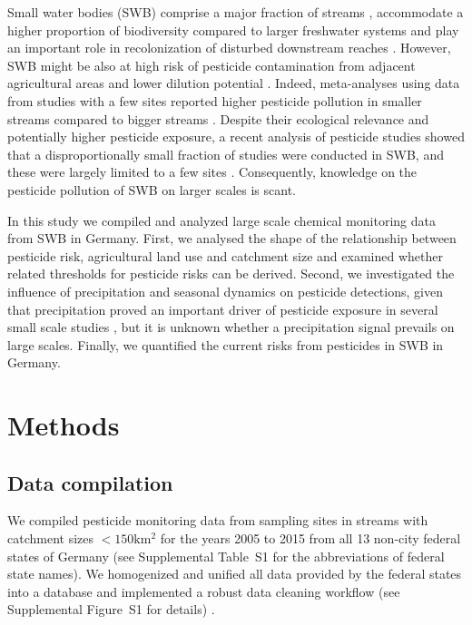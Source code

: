 \documentclass[journal=esthag,manuscript=article]{achemso}
\begin{document}
Small water bodies (SWB) comprise a major fraction of streams \citep{nadeau_hydrological_2007}
, accommodate a higher proportion of biodiversity compared to larger freshwater systems \citep{davies_comparison_2008, biggs_report_2014} and play an important role in recolonization of disturbed downstream reaches \citep{liess_analyzing_2005, orlinskiy_forested_2015}.
However, SWB might be also at high risk of pesticide contamination from adjacent agricultural areas and lower dilution potential \citep{schulz_field_2004,liess_determination_1999}.
Indeed, meta-analyses using data from studies with a few sites reported higher pesticide pollution in smaller streams compared to bigger streams \citep{stehle_pesticide_2015,schulz_field_2004}.
Despite their ecological relevance and potentially higher pesticide exposure, a recent analysis of pesticide studies showed that a disproportionally small fraction of studies were conducted in SWB, and these were largely limited to a few sites \citep{lorenz_specifics_2016}. Consequently, knowledge on the pesticide pollution of SWB on larger scales is scant.

In this study we compiled and analyzed large scale chemical monitoring data from SWB in Germany. First, we analysed the shape of the relationship between pesticide risk, agricultural land use and catchment size and examined whether related thresholds for pesticide risks can be derived. Second, we investigated the influence of precipitation and seasonal dynamics on pesticide detections, given that precipitation proved an important driver of pesticide exposure in several small scale studies \citep{wittmer_significance_2010}\citep{schulz_field_2004}, but it is unknown whether a precipitation signal prevails on large scales. 
Finally, we quantified the current risks from pesticides in SWB in Germany.



\section{Methods}
\subsection{Data compilation}
We compiled pesticide monitoring data from sampling sites in streams with catchment sizes $\mathrm{< 150km^2}$ for the years 2005 to 2015 from all 13 non-city federal states of Germany (see Supplemental Table~S1 for the abbreviations of federal state names). 
We homogenized and unified all data provided by the federal states into a database and implemented a robust data cleaning workflow (see Supplemental Figure~S1 for details) \citep{poisot_best_2015}.
\end{document}
